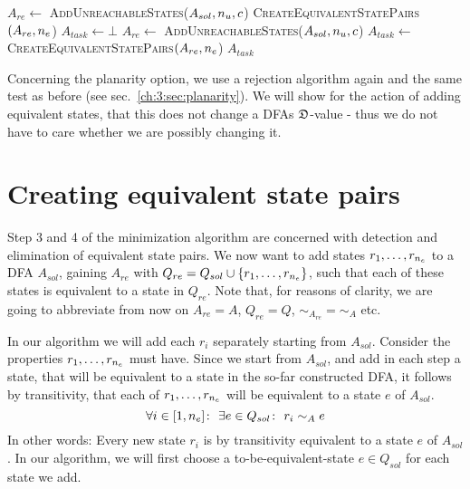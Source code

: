 \vspace{0.2cm}
\begin{spacing}{1}
	\begin{algorithmic}[1]
			\State $A_{re} \gets$ \textsc{AddUnreachableStates}($A_{sol}, {n_u}, c$)
			\State \Return \textsc{CreateEquivalentStatePairs}$(A_{re}, {n_e}$)
		\Else
			\State $A_{task} \gets \bot$
				\State $A_{re} \gets$ \textsc{AddUnreachableStates}($A_{sol}, {n_u}, c$)
				\State $A_{task} \gets$ \textsc{CreateEquivalentStatePairs}$(A_{re}, {n_e}$)
			\EndWhile
			\State \Return $A_{task}$
		\EndIf
		\EndFunction
	\end{algorithmic}
\end{spacing}
\vspace{0.2cm}
\noindent Concerning the planarity option, we use a rejection algorithm again and the same test as before (see sec.~\ref{ch:3:sec:planarity}). We will show for the action of adding equivalent states, that this does not change a DFAs $\mathfrak{D}$-value - thus we do not have to care whether we are possibly changing it.

\section{Creating equivalent state pairs}

Step 3 and 4 of the minimization algorithm are concerned with detection and elimination of equivalent state pairs. We now want to add states $r_1,\ldots,r_{n_e}$ to a DFA $A_{sol}$, gaining $A_{re}$ with $Q_{re} = Q_{sol} \cup \{r_1,\ldots,r_{n_e}\}$, such that each of these states is equivalent to a state in $Q_{re}$. Note that, for reasons of clarity, we are going to abbreviate from now on $A_{re} = A$, $Q_{re} = Q$, $\sim_{A_{re}} = \sim_A$ etc.

In our algorithm we will add each $r_i$ separately starting from $A_{sol}$. Consider the properties $r_1,\ldots,r_{n_e}$ must have. Since we start from $A_{sol}$, and add in each step a state, that will be equivalent to a state in the so-far constructed DFA, it follows by transitivity, that each of $r_1,\ldots,r_{n_e}$ will be equivalent to a state $e$ of $A_{sol}$.
\[
	\forall i \in [1,{n_e}] \colon\ \exists e \in Q_{sol}\colon\ r_i \sim_A e
\]
In other words: Every new state $r_i$ is by transitivity equivalent to a state $e$ of $A_{sol}$. In our algorithm, we will first choose a to-be-equivalent-state $e\in Q_{sol}$ for each state we add.

